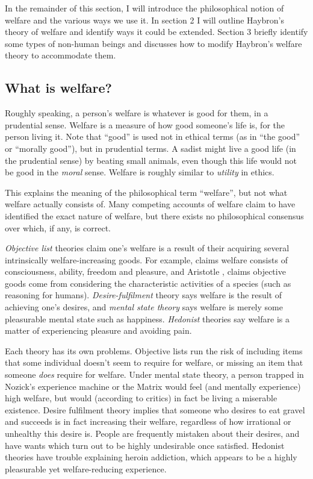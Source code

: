 \documentclass{article}
\begin{document}
In the remainder of this section, I will introduce the philosophical notion of welfare and the various ways we use it. In section 2 I will outline Haybron's theory of welfare and identify ways it could be extended. Section 3 briefly identify some types of non-human beings and discusses how to modify Haybron's welfare theory to accommodate them.

\subsection{What is welfare?}

Roughly speaking, a person's welfare is whatever is good for them, in a prudential sense. Welfare is a measure of how good someone's life is, for the person living it. Note that ``good'' is used not in ethical terms (as in ``the good'' or ``morally good''), but in prudential terms. A sadist might live a good life (in the prudential sense) by beating small animals, even though this life would not be good in the \textit{moral} sense. Welfare is roughly similar to \textit{utility} in ethics. 

This explains the meaning of the philosophical term ``welfare'', but not what welfare actually consists of. Many competing accounts of welfare claim to have identified the exact nature of welfare, but there exists no philosophical consensus over which, if any, is correct.

\textit{Objective list} theories claim one's welfare is a result of their acquiring several intrinsically welfare-increasing goods. For example, \citet{gert1998morality} claims welfare consists of consciousness, ability, freedom and pleasure, and Aristotle \nocite{joachim1951nichomachean}, claims objective goods come from considering the characteristic activities of a species (such as reasoning for humans). \textit{Desire-fulfilment} theory says welfare is the result of achieving one's desires, and \textit{mental state theory} says welfare is merely some pleasurable mental state such as happiness. \textit{Hedonist} theories say welfare is a matter of experiencing pleasure and avoiding pain. 

Each theory has its own problems. Objective lists run the risk of including items that some individual doesn't seem to require for welfare, or missing an item that someone \textit{does} require for welfare. Under mental state theory, a person trapped in Nozick's experience machine or the Matrix would feel (and mentally experience) high welfare, but would (according to critics) in fact be living a miserable existence. Desire fulfilment theory implies that someone who desires to eat gravel and succeeds is in fact increasing their welfare, regardless of how irrational or unhealthy this desire is. People are frequently mistaken about their desires, and have wants which turn out to be highly undesirable once satisfied. Hedonist theories have trouble explaining heroin addiction, which appears to be a highly pleasurable yet welfare-reducing experience. 
\end{document}
